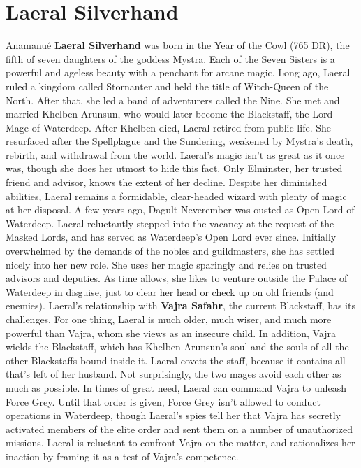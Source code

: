 \documentclass[10pt,a4paper,twoside,twocolumn,openany,nodeprecatedcode]{dndbook}
\begin{document}
\section{Laeral Silverhand}
Anamanué \textbf{Laeral Silverhand} was born in the Year of the Cowl (765 DR), the fifth of seven daughters of the goddess Mystra. Each of the Seven Sisters is a powerful and ageless beauty with a penchant for arcane magic.
Long ago, Laeral ruled a kingdom called Stornanter and held the title of Witch-Queen of the North. After that, she led a band of adventurers called the Nine. She met and married Khelben Arunsun, who would later become the Blackstaff, the Lord Mage of Waterdeep. After Khelben died, Laeral retired from public life. She resurfaced after the Spellplague and the Sundering, weakened by Mystra's death, rebirth, and withdrawal from the world.
Laeral's magic isn't as great as it once was, though she does her utmost to hide this fact. Only Elminster, her trusted friend and advisor, knows the extent of her decline. Despite her diminished abilities, Laeral remains a formidable, clear-headed wizard with plenty of magic at her disposal.
A few years ago, Dagult Neverember was ousted as Open Lord of Waterdeep. Laeral reluctantly stepped into the vacancy at the request of the Masked Lords, and has served as Waterdeep's Open Lord ever since. Initially overwhelmed by the demands of the nobles and guildmasters, she has settled nicely into her new role. She uses her magic sparingly and relies on trusted advisors and deputies. As time allows, she likes to venture outside the Palace of Waterdeep in disguise, just to clear her head or check up on old friends (and enemies).
Laeral's relationship with \textbf{Vajra Safahr}, the current Blackstaff, has its challenges. For one thing, Laeral is much older, much wiser, and much more powerful than Vajra, whom she views as an insecure child. In addition, Vajra wields the Blackstaff, which has Khelben Arunsun's soul and the souls of all the other Blackstaffs bound inside it. Laeral covets the staff, because it contains all that's left of her husband. Not surprisingly, the two mages avoid each other as much as possible.
In times of great need, Laeral can command Vajra to unleash Force Grey. Until that order is given, Force Grey isn't allowed to conduct operations in Waterdeep, though Laeral's spies tell her that Vajra has secretly activated members of the elite order and sent them on a number of unauthorized missions. Laeral is reluctant to confront Vajra on the matter, and rationalizes her inaction by framing it as a test of Vajra's competence.
\end{document}
